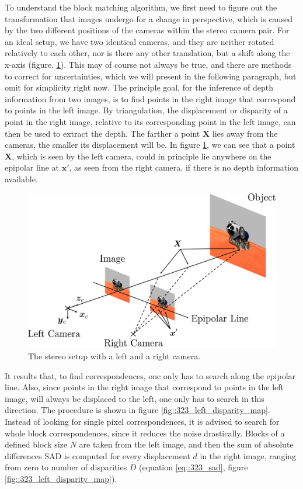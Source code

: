 To understand the block matching algorithm, we first need to figure out the transformation that images undergo for a change in perspective, which is caused by the two different positions of the cameras within the stereo camera pair. For an ideal setup, we have two identical cameras, and they are neither rotated relatively to each other, nor is there any other translation, but a shift along the x-axis (figure. \ref{fig::323_stereo_camera}). This may of course not always be true, and there are methods to correct for uncertainties, which we will present in the following paragraph, but omit for simplicity right now. The principle goal, for the inference of depth information from two images, is to find points in the right image that correspond to points in the left image. By triangulation, the displacement or disparity of a point in the right image, relative to its corresponding point in the left image, can then be used to extract the depth. The farther a point $\bm{X}$ lies away from the cameras, the smaller its displacement will be. In figure \ref{fig::323_stereo_camera}, we can see that a point $\bm{X}$, which is seen by the left camera, could in principle lie anywhere on the epipolar line at $\bm{x}'$, as seen from the right camera, if there is no depth information available. 
\begin{figure}[h]
	\centering
	\includegraphics[scale=.28]{chapters/03_background/img/stereo_camera.png}
	\caption{The stereo setup with a left and a right camera.}
	\label{fig::323_stereo_camera}
\end{figure}
It results that, to find correspondences, one only has to search along the epipolar line. Also, since points in the right image that correspond to points in the left image, will always be displaced to the left, one only has to search in this direction. The procedure is shown in figure \ref{fig::323_left_disparity_map}. Instead of looking for single pixel correspondences, it is advised to search for whole block correspondences, since it reduces the noise drastically. Blocks of a defined block size $N$ are taken from the left image, and then the sum of absolute differences SAD is computed for every displacement $d$ in the right image, ranging from zero to number of disparities $D$ (equation \ref{eq::323_sad}, figure \ref{fig::323_left_disparity_map}).
